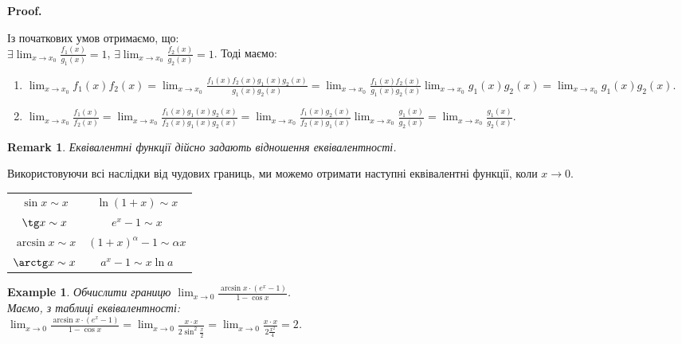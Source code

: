 \documentclass[a4paper, 14pt]{article}
\makeatletter
\def\qed{$\blacksquare$}
\theoremstyle{theoremdd}
\theoremstyle{theoremdd}
\theoremstyle{theoremdd}
\theoremstyle{theoremdd}
\newtheorem{example}[theorem]{Example}
\theoremstyle{theoremdd}
\theoremstyle{theoremdd}
\newtheorem{remark}[theorem]{Remark}
\theoremstyle{theoremdd}
\theoremstyle{theoremdd}
\renewenvironment{proof}[1][Proof.\\]{\par
\pushQED{\hfill \qed}%
\normalfont \topsep6\p@\@plus6\p@\relax
\trivlist
\item\relax
{\bfseries
#1\@addpunct{.}}\hspace\labelsep\ignorespaces
}{%
\popQED\endtrivlist\@endpefalse
}
\makeatother
\begin{document}
\begin{proof}
Із початкових умов отримаємо, що:\\
$\displaystyle \exists \lim_{x \to x_0} \frac{f_1(x)}{g_1(x)} = 1$, $\displaystyle \exists \lim_{x \to x_0} \frac{f_2(x)}{g_2(x)} = 1$. Тоді маємо:
\begin{enumerate}[nosep,wide=0pt,label={\arabic*)}]
\item $\displaystyle \lim_{x \to x_0} f_1(x) f_2(x) = \lim_{x \to x_0} \frac{f_1(x) f_2(x) g_1(x) g_2(x)}{g_1(x) g_2(x)} = \lim_{x \to x_0} \frac{f_1(x) f_2(x)}{g_1(x) g_2(x)} \lim_{x \to x_0} g_1(x) g_2(x) = \lim_{x \to x_0} g_1(x) g_2(x)$.
\item $\displaystyle \lim_{x \to x_0} \frac{f_1(x)}{f_2(x)} = \lim_{x \to x_0} \frac{f_1(x)g_1(x)g_2(x)}{f_2(x)g_1(x)g_2(x)} = \lim_{x \to x_0} \frac{f_1(x)g_2(x)}{f_2(x)g_1(x)} \lim_{x \to x_0} \frac{g_1(x)}{g_2(x)} = \lim_{x \to x_0} \frac{g_1(x)}{g_2(x)}$.
\end{enumerate}
\end{proof}

\begin{remark}
Еквівалентні функції дійсно задають відношення еквівалентності.
\end{remark}

Використовуючи всі наслідки від чудових границь, ми можемо отримати наступні еквівалентні функції, коли $x \to 0$.
\begin{center}
\begin{tabular}{ c c }
 $\sin x \sim x$ & $\ln(1+x) \sim x$ \\ 
 $\tg x \sim x$ & $e^x - 1 \sim x$ \\
 $\arcsin x \sim x$ & $(1+x)^\alpha - 1 \sim \alpha x$ \\
 $\arctg x \sim x$ & $a^x - 1 \sim x \ln a$ \\ 
\end{tabular}
\end{center}

\begin{example}
Обчислити границю $\displaystyle \lim_{x \to 0} \frac{\arcsin x \cdot (e^x - 1)}{1 - \cos x}$.\\
Маємо, з таблиці еквівалентності:\\
$\displaystyle \lim_{x \to 0} \frac{\arcsin x \cdot (e^x - 1)}{1 - \cos x} = \lim_{x \to 0} \frac{x \cdot x}{2 \sin^2 \frac{x}{2}} = \lim_{x \to 0} \frac{x \cdot x}{2 \frac{x^2}{4}} = 2$.
\end{example}
\end{document}
